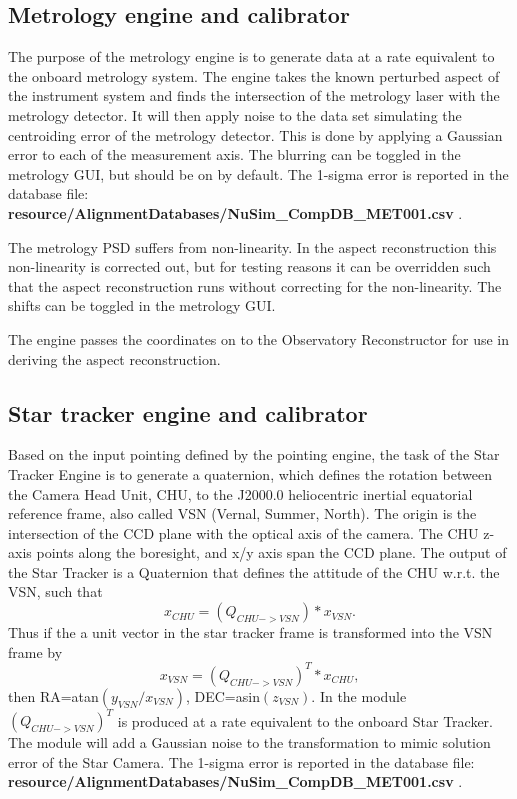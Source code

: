 \subsection{Metrology engine and calibrator}
The purpose of the metrology engine is to generate data at a rate equivalent to the onboard metrology system. The engine takes the known perturbed aspect of the instrument system and finds the intersection of the metrology laser with the metrology detector. It will then apply noise to the data set simulating the centroiding error of the metrology detector. This is done by applying a Gaussian error to each of the measurement axis. The blurring can be toggled in the metrology GUI, but should be on by default. The 1-sigma error is reported in the database file:\\ \textbf{resource/AlignmentDatabases/NuSim\_CompDB\_MET001.csv} . 

The metrology PSD suffers from non-linearity. In the aspect reconstruction this non-linearity is corrected out, but for testing reasons it can be overridden such that the aspect reconstruction runs without correcting for the non-linearity. The shifts can be toggled in the metrology GUI.

The engine passes the coordinates on to the Observatory Reconstructor for use in deriving the aspect reconstruction.

\subsection{Star tracker engine and calibrator}
Based on the input pointing defined by the pointing engine, the task of the Star Tracker Engine is to generate a quaternion, which defines the rotation between the Camera Head Unit, CHU, to the J2000.0 heliocentric inertial equatorial reference frame, also called VSN (Vernal, Summer, North). The origin is the intersection of the CCD plane with the optical axis of the camera. The CHU z-axis points along the boresight, and x/y axis span the CCD plane.
The output of the Star Tracker is a Quaternion that defines the attitude of the CHU w.r.t. the VSN, such that
\begin{equation} 
x_{CHU}=(Q_{CHU->VSN}) * x_{VSN}. 
\end{equation}
Thus if the a unit vector in the star tracker frame is transformed into the VSN frame by 
\begin{equation}
x_{VSN}=(Q_{CHU->VSN} )^T* x_{CHU}, 
\end{equation}
then RA=atan$(y_{VSN}/x_{VSN})$, DEC=asin$(z_{VSN})$. In the module $(Q_{CHU->VSN})^T$ is produced at a rate equivalent to the onboard Star Tracker. The module will add a Gaussian noise to the transformation to mimic solution error of the Star Camera. The 1-sigma error is reported in the database file:\\ \textbf{resource/AlignmentDatabases/NuSim\_CompDB\_MET001.csv} .

